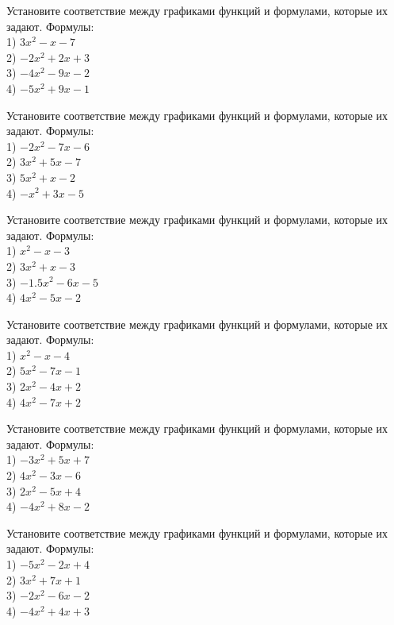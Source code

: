 \documentclass[4apaper]{article}
\begin{document}
\begin{taskBN}{6}
Установите соответствие между графиками функций и формулами, которые их задают. Формулы: \\1) $3x^2-x-7$\\2) $-2x^2+2x+3$\\3) $-4x^2-9x-2$\\4) $-5x^2+9x-1$
\end{taskBN}

\begin{taskBN}{7}
Установите соответствие между графиками функций и формулами, которые их задают. Формулы: \\1) $-2x^2-7x-6$\\2) $3x^2+5x-7$\\3) $5x^2+x-2$\\4) $-x^2+3x-5$
\end{taskBN}

\begin{taskBN}{8}
Установите соответствие между графиками функций и формулами, которые их задают. Формулы: \\1) $x^2-x-3$\\2) $3x^2+x-3$\\3) $-1.5x^2-6x-5$\\4) $4x^2-5x-2$
\end{taskBN}

\begin{taskBN}{9}
Установите соответствие между графиками функций и формулами, которые их задают. Формулы: \\1) $x^2-x-4$\\2) $5x^2-7x-1$\\3) $2x^2-4x+2$\\4) $4x^2-7x+2$
\end{taskBN}

\begin{taskBN}{10}
Установите соответствие между графиками функций и формулами, которые их задают. Формулы: \\1) $-3x^2+5x+7$\\2) $4x^2-3x-6$\\3) $2x^2-5x+4$\\4) $-4x^2+8x-2$
\end{taskBN}

\begin{taskBN}{11}
Установите соответствие между графиками функций и формулами, которые их задают. Формулы: \\1) $-5x^2-2x+4$\\2) $3x^2+7x+1$\\3) $-2x^2-6x-2$\\4) $-4x^2+4x+3$
\end{taskBN}
\end{document}
